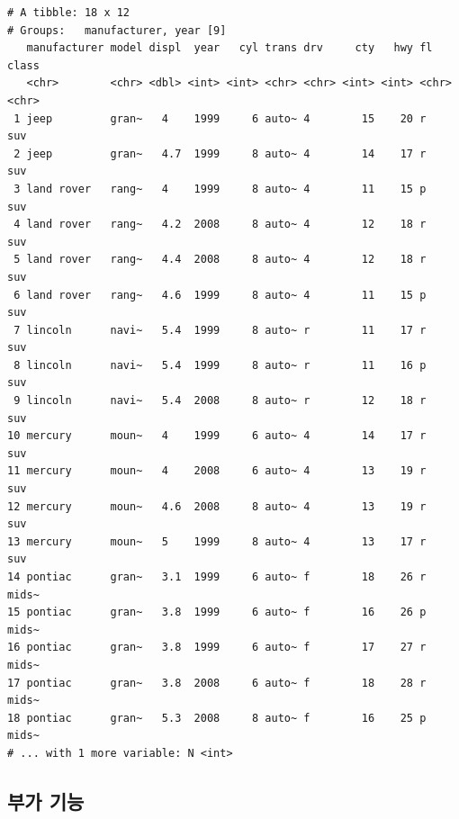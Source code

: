 \documentclass[
  11pt,
]{krantz}
\begin{document}
\begin{verbatim}
# A tibble: 18 x 12
# Groups:   manufacturer, year [9]
   manufacturer model displ  year   cyl trans drv     cty   hwy fl    class
   <chr>        <chr> <dbl> <int> <int> <chr> <chr> <int> <int> <chr> <chr>
 1 jeep         gran~   4    1999     6 auto~ 4        15    20 r     suv  
 2 jeep         gran~   4.7  1999     8 auto~ 4        14    17 r     suv  
 3 land rover   rang~   4    1999     8 auto~ 4        11    15 p     suv  
 4 land rover   rang~   4.2  2008     8 auto~ 4        12    18 r     suv  
 5 land rover   rang~   4.4  2008     8 auto~ 4        12    18 r     suv  
 6 land rover   rang~   4.6  1999     8 auto~ 4        11    15 p     suv  
 7 lincoln      navi~   5.4  1999     8 auto~ r        11    17 r     suv  
 8 lincoln      navi~   5.4  1999     8 auto~ r        11    16 p     suv  
 9 lincoln      navi~   5.4  2008     8 auto~ r        12    18 r     suv  
10 mercury      moun~   4    1999     6 auto~ 4        14    17 r     suv  
11 mercury      moun~   4    2008     6 auto~ 4        13    19 r     suv  
12 mercury      moun~   4.6  2008     8 auto~ 4        13    19 r     suv  
13 mercury      moun~   5    1999     8 auto~ 4        13    17 r     suv  
14 pontiac      gran~   3.1  1999     6 auto~ f        18    26 r     mids~
15 pontiac      gran~   3.8  1999     6 auto~ f        16    26 p     mids~
16 pontiac      gran~   3.8  1999     6 auto~ f        17    27 r     mids~
17 pontiac      gran~   3.8  2008     6 auto~ f        18    28 r     mids~
18 pontiac      gran~   5.3  2008     8 auto~ f        16    25 p     mids~
# ... with 1 more variable: N <int>
\end{verbatim}

\normalsize

\hypertarget{dplyr-verb-variant-adverb}{%
\subsection{부가 기능}\label{dplyr-verb-variant-adverb}}
\end{document}
